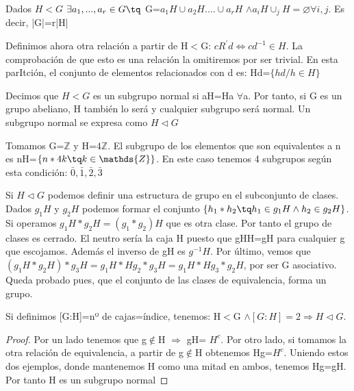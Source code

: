 \documentclass[a4paper,10pt]{apuntes}
\begin{document}
  \begin{theorem}
   Dados $H<G$  $\exists a_{1},...,a_{r}\in G\tq$  G=$a_{1}H \cup a_{2}H.... \cup a_{r}H$  $\wedge a_{i}H\cup_{j}H=\varnothing \forall i,j$.
   Es decir, |G|=r|H|
  \end{theorem}

  Definimos ahora otra relación a partir de H$<$G: $cR^{'}d \Leftrightarrow cd^{-1}\in H$. La comprobación de que esto es una relación
  la omitiremos por ser trivial. En esta parItción, el conjunto de elementos relacionados con d es: Hd=$\{hd/h\in H\}$
  \begin{defn}
   Decimos que $H<G$  es un subgrupo normal si aH=Ha $\forall$a. Por tanto, si G es un grupo abeliano, H también lo será y cualquier
   subgrupo será normal. Un subgrupo normal se expresa como $H\lhd G$
  \end{defn}
  \begin{example}
   Tomamos G=$\mathds{Z}$  y H=$4\mathds{Z}$. 
   El subgrupo de los elementos que son equivalentes a n es nH=$\{n*4k\tq k \in \mathds{Z}\}$.
   En este caso tenemos 4 subgrupos según esta condición: $\bar{0},\bar{1},\bar{2},\bar{3}$
  \end{example}
  
  Si $H\lhd G$  podemos definir una estructura de grupo en el subconjunto de clases.
  Dados $g_{1}H$  y $g_{2}H$  podemos formar el conjunto $\{h_{1}*h_{2}\tq h_{1}\in g_{1}H \wedge h_{2}\in g_{2}H\}$. Si operamos
  $g_{1}H*g_{2}H=(g_{1}*g_{2})H$  que es otra clase. Por tanto el grupo de clases es cerrado.
  El neutro sería la caja H puesto que gHH=gH para cualquier g que escojamos. Además el inverso de gH es $g^{-1}H$.
  Por último, vemos que $(g_{1}H*g_{2}H)*g_{3}H=g_{1}H*Hg_{2}*g_{3}H=g_{1}H*Hg_{3}*g_{2}H$, por ser G asociativo. Queda probado pues, 
  que el conjunto de las clases de equivalencia, forma un grupo.
  
  \begin{theorem}
   Si definimos [G:H]=nº de cajas=índice, tenemos:
   H$<$G $\wedge[G:H]=2 \Rightarrow H \lhd G$.
  \end{theorem}
  \begin{proof}
   Por un lado tenemos que g$\notin$H $\Rightarrow$  gH= $H^{c}$.
   Por otro lado, si tomamos la otra relación de equivalencia, a partir de g$\notin$H obtenemos Hg=$H^{c}$.
   Uniendo estos dos ejemplos, donde mantenemos H como una mitad en ambos, tenemos Hg=gH. Por tanto H es un subgrupo normal
  \end{proof}
  
\end{document}
